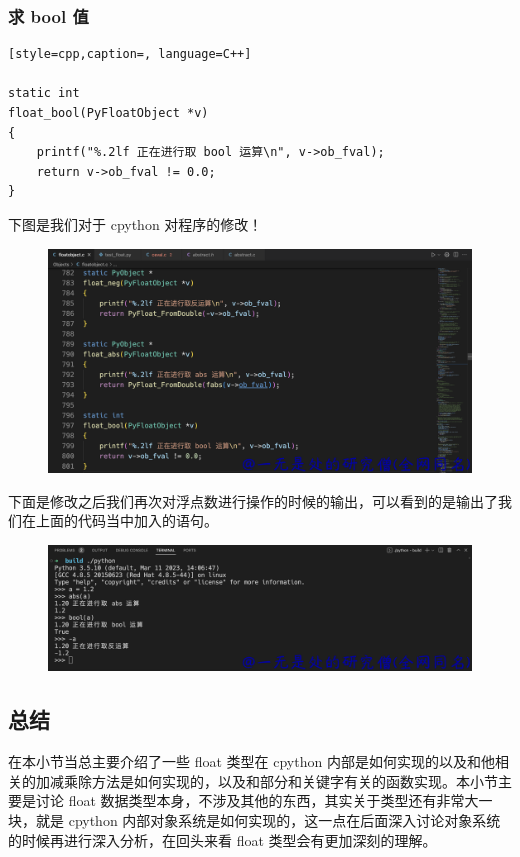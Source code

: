 \subsubsection{求 bool 值}
\begin{lstlisting}[style=cpp,caption=, language=C++]

static int
float_bool(PyFloatObject *v)
{
    printf("%.2lf 正在进行取 bool 运算\n", v->ob_fval);
    return v->ob_fval != 0.0;
}
\end{lstlisting}
下图是我们对于 cpython 对程序的修改！

    \begin{figure}[H]
        \centering
            \includegraphics[scale=.12]{images/14-float.png}
            \caption{ }
        \label{fig:my_label}
    \end{figure}
    
下面是修改之后我们再次对浮点数进行操作的时候的输出，可以看到的是输出了我们在上面的代码当中加入的语句。

    \begin{figure}[H]
        \centering
            \includegraphics[scale=.2]{images/13-float.png}
            \caption{ }
        \label{fig:my_label}
    \end{figure}
    
\subsection{总结}
在本小节当总主要介绍了一些 float 类型在 cpython 内部是如何实现的以及和他相关的加减乘除方法是如何实现的，以及和部分和关键字有关的函数实现。本小节主要是讨论 float 数据类型本身，不涉及其他的东西，其实关于类型还有非常大一块，就是 cpython 内部对象系统是如何实现的，这一点在后面深入讨论对象系统的时候再进行深入分析，在回头来看 float 类型会有更加深刻的理解。
